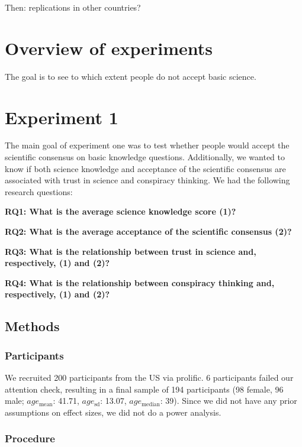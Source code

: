\documentclass[
  doc,floatsintext]{apa6}
\begin{document}
Then: replications in other countries?

\section{Overview of experiments}\label{overview-of-experiments}

The goal is to see to which extent people do not accept basic science.

\section{Experiment 1}\label{experiment-1}

The main goal of experiment one was to test whether people would accept the scientific consensus on basic knowledge questions. Additionally, we wanted to know if both science knowledge and acceptance of the scientific consensus are associated with trust in science and conspiracy thinking. We had the following research questions:

\textbf{RQ1: What is the average science knowledge score (1)?}

\textbf{RQ2: What is the average acceptance of the scientific consensus (2)?}

\textbf{RQ3: What is the relationship between trust in science and, respectively, (1) and (2)?}

\textbf{RQ4: What is the relationship between conspiracy thinking and, respectively, (1) and (2)?}

\subsection{Methods}\label{methods}

\subsubsection{Participants}\label{participants}

We recruited 200 participants from the US via prolific. 6 participants failed our attention check, resulting in a final sample of 194 participants (98 female, 96 male; \(age_\text{mean}\): 41.71, \(age_\text{sd}\): 13.07, \(age_\text{median}\): 39). Since we did not have any prior assumptions on effect sizes, we did not do a power analysis.

\subsubsection{Procedure}\label{procedure}
\end{document}
